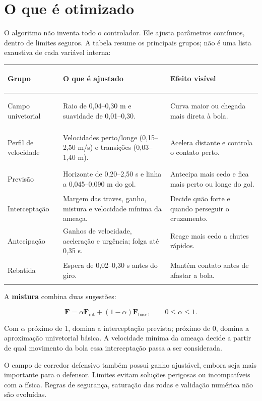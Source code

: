 \documentclass[11pt,a4paper]{article}
\newcommand{\termo}[1]{\textbf{\color{azulescuro}#1}}
\begin{document}
\section{O que é otimizado}

O algoritmo não inventa todo o controlador. Ele ajusta parâmetros contínuos,
dentro de limites seguros. A tabela resume os principais grupos; não é uma
lista exaustiva de cada variável interna:

\small
\begin{tabularx}{\linewidth}{>{\bfseries\raggedright\arraybackslash}p{2.8cm} p{6.0cm} X}
\toprule
Grupo & O que é ajustado & Efeito visível \\
\midrule
Campo univetorial & Raio de 0,04--0,30 m e suavidade de 0,01--0,30. & Curva maior ou chegada mais direta à bola. \\
Perfil de velocidade & Velocidades perto/longe (0,15--2,50 m/s) e transições (0,03--1,40 m). & Acelera distante e controla o contato perto. \\
Previsão & Horizonte de 0,20--2,50 s e linha a 0,045--0,090 m do gol. & Antecipa mais cedo e fica mais perto ou longe do gol. \\
Interceptação & Margem das traves, ganho, mistura e velocidade mínima da ameaça. & Decide quão forte e quando perseguir o cruzamento. \\
Antecipação & Ganhos de velocidade, aceleração e urgência; folga até 0,35 s. & Reage mais cedo a chutes rápidos. \\
Rebatida & Espera de 0,02--0,30 s antes do giro. & Mantém contato antes de afastar a bola. \\
\bottomrule
\end{tabularx}
\normalsize

A \termo{mistura} combina duas sugestões:

\[
 \mathbf{F}=\alpha\mathbf{F}_{\mathrm{int}}+
 (1-\alpha)\mathbf{F}_{\mathrm{base}},\qquad 0\leq\alpha\leq1.
\]

Com $\alpha$ próximo de 1, domina a interceptação prevista; próximo de 0,
domina a aproximação univetorial básica. A velocidade mínima da ameaça decide
a partir de qual movimento da bola essa interceptação passa a ser considerada.

O campo de corredor defensivo também possui ganho ajustável, embora seja mais
importante para o defensor. Limites evitam soluções perigosas ou incompatíveis
com a física. Regras de segurança, saturação das rodas e validação numérica não
são evoluídas.
\end{document}
